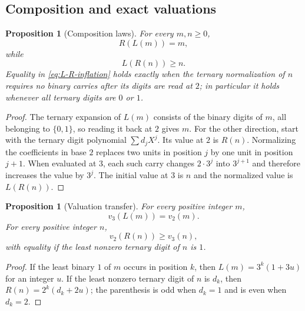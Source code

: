 \documentclass[11pt]{article}
\newtheorem{proposition}[theorem]{Proposition}
\theoremstyle{definition}
\theoremstyle{remark}
\begin{document}
\subsection{Composition and exact valuations}

\begin{proposition}[Composition laws]\label{prop:digit-composition}
For every $m,n\ge0$,
\begin{equation}\label{eq:R-L-identity}
 R(L(m))=m,
\end{equation}
while
\begin{equation}\label{eq:L-R-inflation}
 L(R(n))\ge n.
\end{equation}
Equality in \eqref{eq:L-R-inflation} holds exactly when the ternary normalization of
$n$ requires no binary carries after its digits are read at $2$; in particular it
holds whenever all ternary digits are $0$ or $1$.
\end{proposition}

\begin{proof}
The ternary expansion of $L(m)$ consists of the binary digits of $m$, all belonging
to $\{0,1\}$, so reading it back at $2$ gives $m$.  For the other direction, start
with the ternary digit polynomial $\sum d_jX^j$.  Its value at $2$ is $R(n)$.
Normalizing the coefficients in base $2$ replaces two units in position $j$ by one
unit in position $j+1$.  When evaluated at $3$, each such carry changes
$2\cdot3^j$ into $3^{j+1}$ and therefore increases the value by $3^j$.  The initial
value at $3$ is $n$ and the normalized value is $L(R(n))$.
\end{proof}

\begin{proposition}[Valuation transfer]\label{prop:digit-valuation}
For every positive integer $m$,
\begin{equation}\label{eq:L-valuation}
 v_3(L(m))=v_2(m).
\end{equation}
For every positive integer $n$,
\begin{equation}\label{eq:R-valuation}
 v_2(R(n))\ge v_3(n),
\end{equation}
with equality if the least nonzero ternary digit of $n$ is $1$.
\end{proposition}

\begin{proof}
If the least binary $1$ of $m$ occurs in position $k$, then
$L(m)=3^k(1+3u)$ for an integer $u$.  If the least nonzero ternary digit of $n$ is
$d_k$, then $R(n)=2^k(d_k+2u)$; the parenthesis is odd when $d_k=1$ and is even when
$d_k=2$.
\end{proof}
\end{document}

